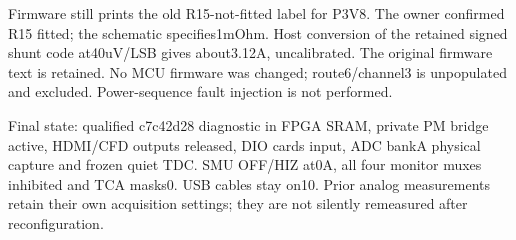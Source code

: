 Firmware still prints the old R15-not-fitted label for P3V8. The owner confirmed R15 fitted; the schematic specifies1mOhm. Host conversion of the retained signed shunt code at40uV/LSB gives about3.12A, uncalibrated. The original firmware text is retained. No MCU firmware was changed; route6/channel3 is unpopulated and excluded. Power-sequence fault injection is not performed.

Final state: qualified c7c42d28 diagnostic in FPGA SRAM, private PM bridge active, HDMI/CFD outputs released, DIO cards input, ADC bankA physical capture and frozen quiet TDC. SMU OFF/HIZ at0A, all four monitor muxes inhibited and TCA masks0. USB cables stay on10. Prior analog measurements retain their own acquisition settings; they are not silently remeasured after reconfiguration.

